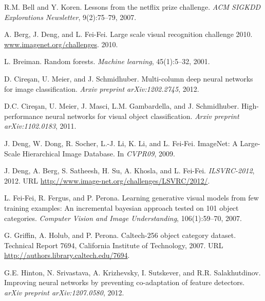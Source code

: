 \documentclass{article} %
\begin{document}
\small

\begin{thebibliography}{99}

R.M. Bell and Y. Koren. Lessons from the netflix prize challenge. {\em ACM SIGKDD Explorations Newsletter}, 9(2):75–79, 2007.
\vspace{-1mm}

A. Berg, J. Deng, and L. Fei-Fei. Large scale visual recognition challenge 2010. \url{www.imagenet.org/challenges}. 2010.
\vspace{-1mm}

L. Breiman. Random forests. {\em Machine learning}, 45(1):5–32, 2001.
\vspace{-1mm}

D. Cire\c{s}an, U. Meier, and J. Schmidhuber. Multi-column deep neural networks for image classification.
{\em Arxiv preprint arXiv:1202.2745}, 2012.
\vspace{-1mm}

D.C. Cire\c{s}an, U. Meier, J. Masci, L.M. Gambardella, and J. Schmidhuber. High-performance neural
networks for visual object classification. {\em Arxiv preprint arXiv:1102.0183}, 2011.

J. Deng, W. Dong, R. Socher, L.-J. Li, K. Li, and L. Fei-Fei. ImageNet: A Large-Scale Hierarchical
Image Database. In {\em CVPR09}, 2009.
\vspace{-1mm}

J. Deng, A. Berg, S. Satheesh, H. Su, A. Khosla, and L. Fei-Fei. {\em ILSVRC-2012}, 2012. URL
\url{http://www.image-net.org/challenges/LSVRC/2012/}.
\vspace{-1mm}

L. Fei-Fei, R. Fergus, and P. Perona. Learning generative visual models from few training examples: An
incremental bayesian approach tested on 101 object categories. {\em Computer Vision and Image Understanding},
106(1):59–70, 2007.
\vspace{-1mm}

G. Griffin, A. Holub, and P. Perona. Caltech-256 object category dataset. Technical Report 7694, California
Institute of Technology, 2007. URL \url{http://authors.library.caltech.edu/7694}.
\vspace{-1mm}

G.E. Hinton, N. Srivastava, A. Krizhevsky, I. Sutskever, and R.R. Salakhutdinov. Improving neural networks
by preventing co-adaptation of feature detectors. {\em arXiv preprint arXiv:1207.0580}, 2012.
\vspace{-1mm}


\end{thebibliography}
\end{document}
